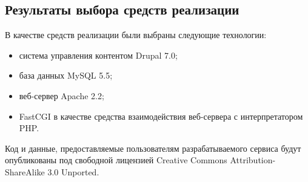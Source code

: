 \subsection{Результаты выбора средств реализации}
\label{ssec:choice_results}

В качестве средств реализации были выбраны следующие технологии:
\begin{itemize}
\item система управления контентом Drupal 7.0;
\item база данных MySQL 5.5;
\item веб-сервер Apache 2.2;
\item FastCGI в качестве средства взаимодействия веб-сервера
  с интерпретатором PHP.

\end{itemize}

Код и данные, предоставляемые пользователям разрабатываемого сервиса
будут опубликованы под свободной лицензией
Creative Commons Attribution-ShareAlike 3.0 Unported.